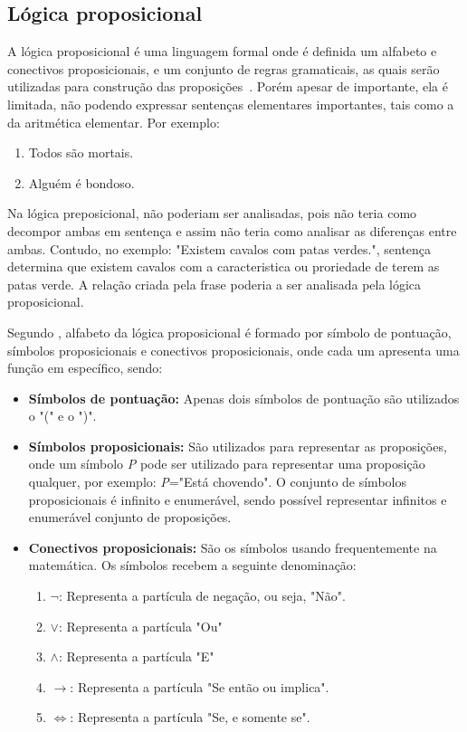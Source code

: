 \subsection{Lógica proposicional}

A lógica proposicional é uma linguagem formal onde é definida um alfabeto e conectivos proposicionais, e um conjunto de regras gramaticais, as quais serão utilizadas para construção das proposições~\cite{souza2017logica}. Porém apesar de importante, ela é limitada, não podendo expressar sentenças elementares importantes, tais como a da aritmética elementar. Por exemplo:
\begin{enumerate}
\item Todos são mortais.
\item Alguém é bondoso.
\end{enumerate}

\par
Na lógica preposicional, não poderiam ser analisadas, pois não teria como decompor ambas em sentença e assim não teria como analisar as diferenças entre ambas. Contudo, no exemplo: "Existem cavalos com patas verdes.", sentença determina que existem cavalos com a caracteristica ou proriedade de terem as patas verde. A relação criada pela frase poderia a ser analisada pela lógica proposicional\cite{abe2002introducao}.


Segundo , alfabeto da lógica proposicional é formado por símbolo de pontuação, símbolos proposicionais e conectivos proposicionais, onde cada um apresenta uma função em específico, sendo:
\begin{itemize}
  \item \textbf{Símbolos de pontuação: }Apenas dois símbolos de pontuação são utilizados o "(" e o ")".
  \item \textbf{Símbolos proposicionais:} São utilizados para representar as proposições, onde um símbolo \textit{P} pode ser utilizado para representar uma proposição qualquer, por exemplo: \textit{P}="Está chovendo". O conjunto de símbolos proposicionais é infinito e enumerável, sendo possível representar infinitos e enumerável conjunto de proposições.
  \item \textbf{Conectivos proposicionais:} São os símbolos usando frequentemente na matemática. Os símbolos recebem a seguinte denominação: 
\begin{enumerate}
\item \textbf{$\neg$}: Representa a partícula de negação, ou seja, "Não".
\item \textbf{$\lor$}: Representa a partícula "Ou"
\item \textbf{$\land$}: Representa a partícula "E"
\item \textbf{$\rightarrow$}: Representa a partícula "Se então ou implica".
\item \textbf{$\Leftrightarrow$}: Representa a partícula "Se, e somente se".
\end{enumerate} 
\end{itemize}


